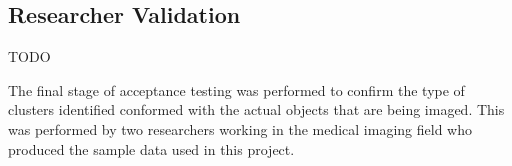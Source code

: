 \subsection{Researcher Validation}
\label{sub:researcher_validation}

TODO

The final stage of acceptance testing was performed to confirm the type of
clusters identified conformed with the actual objects that are being imaged.
This was performed by two researchers working in the medical imaging field who
produced the sample data used in this project.
